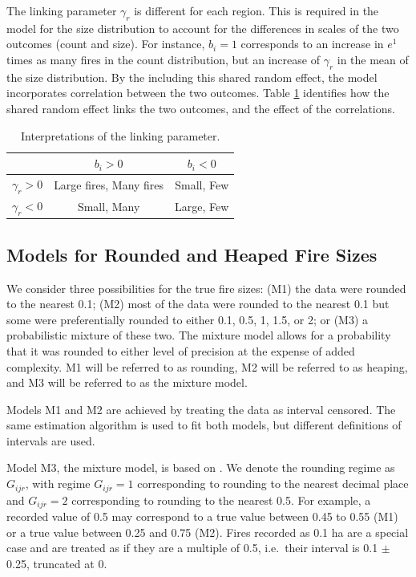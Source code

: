 \documentclass[10pt,letterpaper]{article}
\begin{document}
The linking parameter \(\gamma_r\) is different for each region.
This is required in the model for the size distribution to
account for the differences in scales of the two outcomes (count and size). For instance,
\(b_i = 1\) corresponds to an increase in \(e^1\) times as many fires in
the count distribution, but an increase of \(\gamma_r\) in the mean of
the size distribution. By the including this shared random effect, the
model incorporates correlation between the two outcomes. Table
\ref{interb} identifies how the shared random effect links the two
outcomes, and the effect of the correlations.

\begin{table}[h!]
\centering
\begin{tabular}{c | c c}
               & $b_i > 0$   & $b_i < 0$ \\ \hline
$\gamma_r > 0$ & Large fires, Many fires & Small, Few\\
$\gamma_r < 0$ & Small, Many & Large, Few
\end{tabular}
\caption{Interpretations of the linking parameter.}
\label{interb}
\end{table}

\hypertarget{models-for-rounded-and-heaped-fire-sizes}{%
\subsection{Models for Rounded and Heaped Fire
Sizes}\label{models-for-rounded-and-heaped-fire-sizes}}

We consider three possibilities for the true fire sizes: (M1) the data
were rounded to the nearest 0.1; (M2) most of the data were rounded to
the nearest 0.1 but some were preferentially rounded to either 0.1, 0.5,
1, 1.5, or 2; or (M3) a probabilistic mixture of these two. The
mixture model allows for a probability that it was rounded to either
level of precision at the expense of added complexity. M1 will be
referred to as rounding, M2 will be referred to as heaping, and M3
will be referred to as the mixture model.

Models M1 and M2 are achieved by treating the data as interval
censored. The same estimation algorithm is used to fit both models, but
different definitions of intervals are used.

Model M3, the mixture model, is based on
\cite{wangModelingHeapingSelf2008}. We denote the rounding regime as
\(G_{ijr}\), with regime \(G_{ijr}=1\) corresponding to rounding to the
nearest decimal place and \(G_{ijr} = 2\) corresponding to rounding to
the nearest 0.5. For example, a recorded value of 0.5 may correspond to
a true value between 0.45 to 0.55 (M1) or a true value between 0.25 and
0.75 (M2). Fires recorded as 0.1 ha are a special case and are treated
as if they are a multiple of 0.5, i.e.~their interval is 0.1 \(\pm\) 0.25,
truncated at 0.
\end{document}
